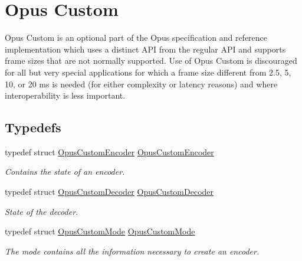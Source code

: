 \hypertarget{group__opus__custom}{
\section{Opus Custom}
\label{group__opus__custom}
}


Opus Custom is an optional part of the Opus specification and reference implementation which uses a distinct API from the regular API and supports frame sizes that are not normally supported. Use of Opus Custom is discouraged for all but very special applications for which a frame size different from 2.5, 5, 10, or 20 ms is needed (for either complexity or latency reasons) and where interoperability is less important.  
\subsection*{Typedefs}
\begin{DoxyCompactItemize}
\item 
typedef struct \hyperlink{group__opus__custom_ga7abe6a7afc599667950251c987feb439}{OpusCustomEncoder} \hyperlink{group__opus__custom_ga7abe6a7afc599667950251c987feb439}{OpusCustomEncoder}
\begin{DoxyCompactList}\small\item\em Contains the state of an encoder. \item\end{DoxyCompactList}\item 
typedef struct \hyperlink{group__opus__custom_gacae60f89c5ce7aeea69503451b9e2e6f}{OpusCustomDecoder} \hyperlink{group__opus__custom_gacae60f89c5ce7aeea69503451b9e2e6f}{OpusCustomDecoder}
\begin{DoxyCompactList}\small\item\em State of the decoder. \item\end{DoxyCompactList}\item 
typedef struct \hyperlink{group__opus__custom_gaf33847c711195b9edef896b73c96ec4f}{OpusCustomMode} \hyperlink{group__opus__custom_gaf33847c711195b9edef896b73c96ec4f}{OpusCustomMode}
\begin{DoxyCompactList}\small\item\em The mode contains all the information necessary to create an encoder. \item\end{DoxyCompactList}\end{DoxyCompactItemize}
